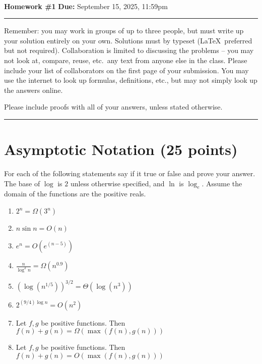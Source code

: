 \documentclass[11pt]{article}
\begin{document}
\\
{{\bf Homework \#1}} \hfill {{\bf Due:} September 15, 2025, 11:59pm} \\
\rule[0.1in]{\textwidth}{0.4pt}

Remember: you may work in groups of up to three people, but must write up your solution entirely on your own.  Solutions must by typeset (\LaTeX\ preferred but not required).  Collaboration is limited to discussing the problems -- you may not look at, compare, reuse, etc.~any text from anyone else in the class.  Please include your list of collaborators on the first page of your submission.  You may use the internet to look up formulas, definitions, etc., but may not simply look up the answers online.  

Please include proofs with all of your answers, unless stated otherwise.

\noindent \rule[0.1in]{\textwidth}{0.4pt}

\section{Asymptotic Notation (25 points)}

For each of the following statements say if it true or false and prove your answer.  The base of $\log$ is $2$ unless otherwise specified, and $\ln$ is $\log_e$.  Assume the domain of the functions are the positive reals.

\begin{enumerate}

\item $2^n = \Omega(3^n)$


\item $n \sin n = O(n)$

\item $e^n = O(e^{(n-5)})$

\item $\frac{n}{\log^2 n} = \Omega(n^{0.9})$

\item $(\log(n^{1/5}))^{3/2} = \Theta(\log (n^{3}))$

\item $2^{(9/4) \log n} = O(n^2)$

\item Let $f,g$ be positive functions. Then $f(n)+g(n) = \Omega(\max(f(n),g(n)))$

\item Let $f,g$ be positive functions. Then $f(n)+g(n) = O(\max(f(n),g(n)))$


\end{enumerate}
\end{document}
